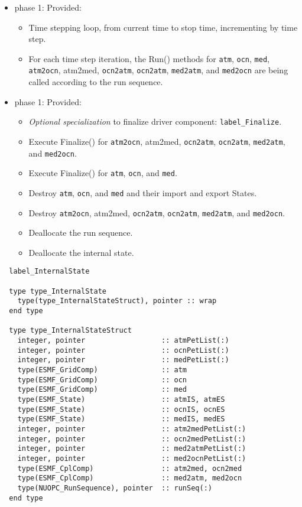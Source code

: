 \begin{itemize}
\item phase 1: {\sc Provided:}
  \begin{itemize}
  \item Time stepping loop, from current time to stop time, incrementing by time step.
  \item For each time step iteration, the Run() methods for {\tt atm}, {\tt ocn}, {\tt med}, {\tt atm2ocn}, {atm2med}, {\tt ocn2atm}, {\tt ocn2atm}, {\tt med2atm}, and {\tt med2ocn} are being called according to the run sequence.
  \end{itemize}    
\end{itemize}

\begin{itemize}
\item phase 1: {\sc Provided:}
  \begin{itemize}
  \item {\it Optional specialization} to finalize driver component: {\tt label\_Finalize}.
  \item Execute Finalize() for {\tt atm2ocn}, {atm2med}, {\tt ocn2atm}, {\tt ocn2atm}, {\tt med2atm}, and {\tt med2ocn}.
  \item Execute Finalize() for {\tt atm}, {\tt ocn}, and {\tt med}.
  \item Destroy {\tt atm}, {\tt ocn}, and {\tt med} and their import and export States.
  \item Destroy {\tt atm2ocn}, {atm2med}, {\tt ocn2atm}, {\tt ocn2atm}, {\tt med2atm}, and {\tt med2ocn}.
  \item Deallocate the run sequence.
  \item Deallocate the internal state.
  \end{itemize}      
\end{itemize}

\begin{verbatim}  label_InternalState

  type type_InternalState
    type(type_InternalStateStruct), pointer :: wrap
  end type

  type type_InternalStateStruct
    integer, pointer                  :: atmPetList(:)
    integer, pointer                  :: ocnPetList(:)
    integer, pointer                  :: medPetList(:)
    type(ESMF_GridComp)               :: atm
    type(ESMF_GridComp)               :: ocn
    type(ESMF_GridComp)               :: med
    type(ESMF_State)                  :: atmIS, atmES
    type(ESMF_State)                  :: ocnIS, ocnES
    type(ESMF_State)                  :: medIS, medES
    integer, pointer                  :: atm2medPetList(:)
    integer, pointer                  :: ocn2medPetList(:)
    integer, pointer                  :: med2atmPetList(:)
    integer, pointer                  :: med2ocnPetList(:)
    type(ESMF_CplComp)                :: atm2med, ocn2med
    type(ESMF_CplComp)                :: med2atm, med2ocn
    type(NUOPC_RunSequence), pointer  :: runSeq(:)
  end type

\end{verbatim}


